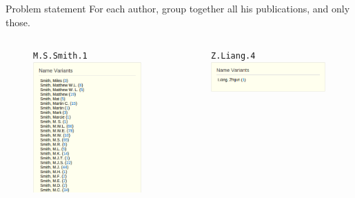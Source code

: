 \documentclass{beamer}
\begin{document}
\begin{frame}{Problem statement}
For each author, group together all his publications, and only those.

\footnotesize{
\begin{columns}[T]

\begin{column}{0.33\textwidth}
\begin{figure}
\texttt{M.S.Smith.1}
\includegraphics[width=\textwidth]{figures/no-more.png}
\end{figure}
\end{column}
\begin{column}{0.33\textwidth}
\begin{figure}
\texttt{Z.Liang.4}
\includegraphics[width=\textwidth]{figures/no-less.png}


\end{figure}
\end{column}
\end{columns}}
\end{frame}
\end{document}
